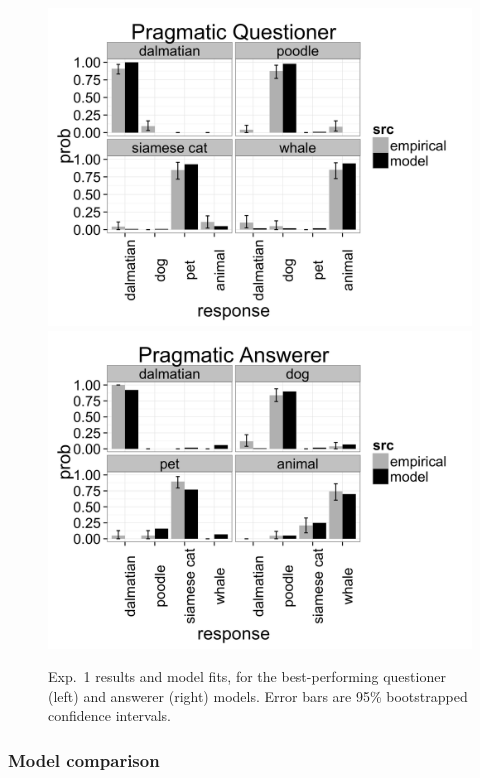 \documentclass[12pt, floatsintext, jou]{apa6}
\begin{document}
\begin{figure}[t!]
\begin{center}
\includegraphics[scale = .11]{exp3QuestResultsPragmatic.png}
\includegraphics[scale = .11]{exp3AnsResultsPragmatic.png}
\end{center}
\caption{Exp.~1 results and model fits, for the best-performing questioner (left) and answerer (right) models. Error bars are 95\% bootstrapped confidence intervals.}
\label{fig:exp3res}
\end{figure}

\subsubsection{Model comparison}
\end{document}

